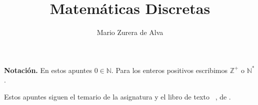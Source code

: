 \documentclass[12pt]{article}
\title{Matemáticas Discretas}
\author{Mario Zurera de Alva}
\date{}
\begin{document}
\maketitle

\noindent\textbf{Notación.} En estos apuntes $0 \in \mathbb{N}$.
Para los enteros positivos escribimos $\mathbb{Z}^{+}$ o $\mathbb{N}^{*}$.

\noindent Estos apuntes siguen el temario de la asignatura y el libro de texto
~\cite{bujalance}, de \citeauthor{bujalance}.


\tableofcontents


% 
% 

\printbibliography %
\end{document}
